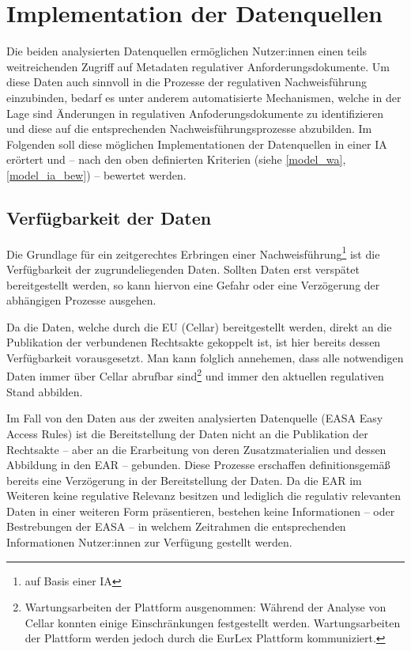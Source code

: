 
\chapter{Implementation der Datenquellen} \label{anal}

    Die beiden analysierten Datenquellen ermöglichen Nutzer:innen einen teils weitreichenden Zugriff auf Metadaten regulativer Anforderungsdokumente.
    Um diese Daten auch sinnvoll in die Prozesse der regulativen Nachweisführung einzubinden, bedarf es unter anderem automatisierte Mechanismen, welche in der Lage sind Änderungen in regulativen Anfoderungsdokumente zu identifizieren und diese auf die entsprechenden Nachweisführungsprozesse abzubilden.
    Im Folgenden soll diese möglichen Implementationen der Datenquellen in einer \acf{IA} erörtert und -- nach den oben definierten Kriterien (siehe \ref{model_wa}, \ref{model_ia_bew}) -- bewertet werden.

    \section{Verfügbarkeit der Daten}

    Die Grundlage für ein zeitgerechtes Erbringen einer Nachweisführung\footnote{auf Basis einer \ac{IA}} ist die Verfügbarkeit der zugrundeliegenden Daten.
    Sollten Daten erst verspätet bereitgestellt werden, so kann hiervon eine Gefahr oder eine Verzögerung der abhängigen Prozesse ausgehen.

    \medskip
    Da die Daten, welche durch die \ac{EU} (Cellar) bereitgestellt werden, direkt an die Publikation der verbundenen Rechtsakte gekoppelt ist, ist hier bereits dessen Verfügbarkeit vorausgesetzt.
    Man kann folglich annehemen, dass alle notwendigen Daten immer über Cellar abrufbar sind\footnote{Wartungsarbeiten der Plattform ausgenommen: Während der Analyse von Cellar konnten einige Einschränkungen festgestellt werden. Wartungsarbeiten der Plattform werden jedoch durch die EurLex Plattform kommuniziert.} und immer den aktuellen regulativen Stand abbilden.

    \medskip
    Im Fall von den Daten aus der zweiten analysierten Datenquelle (\ac{EASA} Easy Access Rules) ist die Bereitstellung der Daten nicht an die Publikation der Rechtsakte -- aber an die Erarbeitung von deren Zusatzmaterialien und dessen Abbildung in den \ac{EAR} -- gebunden.
    Diese Prozesse erschaffen definitionsgemäß bereits eine Verzögerung in der Bereitstellung der Daten.
    Da die \ac{EAR} im Weiteren keine regulative Relevanz besitzen und lediglich die regulativ relevanten Daten in einer weiteren Form präsentieren, bestehen keine Informationen -- oder Bestrebungen der \ac{EASA} \cite{easa_xml_export} -- in welchem Zeitrahmen die entsprechenden Informationen Nutzer:innen zur Verfügung gestellt werden.    


